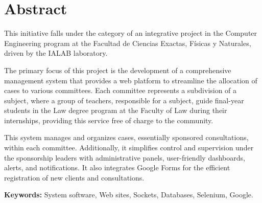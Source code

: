 
\chapter*{Abstract}

This initiative falls under the category of an integrative project in the Computer Engineering program at the  Facultad de Ciencias Exactas, Físicas y Naturales, driven by the IALAB laboratory.

The primary focus of this project is the development of a comprehensive management system that provides a web platform to streamline the allocation of cases to various committees. Each committee represents a subdivision of a subject, where a group of teachers, responsible for a subject, guide final-year students in the Law degree program at the Faculty of Law during their internships, providing this service free of charge to the community.

This system manages and organizes cases, essentially sponsored consultations, within each committee. Additionally, it simplifies control and supervision under the sponsorship leaders with administrative panels, user-friendly dashboards, alerts, and notifications. It also integrates Google Forms for the efficient registration of new clients and consultations.

\vspace{.5cm}

\textbf{Keywords:} System software, Web sites, Sockets, Databases, Selenium, Google.


\vspace{.5cm}
